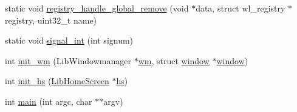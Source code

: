 \begin{DoxyCompactItemize}
\item 
static void \hyperlink{simple-egl_8cpp_a59a731b9efa9d6a2015cdc8ccae1db80}{registry\+\_\+handle\+\_\+global\+\_\+remove} (void $\ast$data, struct wl\+\_\+registry $\ast$registry, uint32\+\_\+t name)
\item 
static void \hyperlink{simple-egl_8cpp_a2cfc8c2d3fc1273ba8f811d2e639aec8}{signal\+\_\+int} (int signum)
\item 
int \hyperlink{simple-egl_8cpp_a644e25276ecdea04f2aa3412c1973927}{init\+\_\+wm} (Lib\+Windowmanager $\ast$\hyperlink{simple-egl_8cpp_ad1513698e07197206c290f94d7669d85}{wm}, struct \hyperlink{structwindow}{window} $\ast$\hyperlink{structwindow}{window})
\item 
int \hyperlink{simple-egl_8cpp_a79aafeb99915566dd3970246f465f306}{init\+\_\+hs} (\hyperlink{class_lib_home_screen}{Lib\+Home\+Screen} $\ast$\hyperlink{simple-egl_8cpp_a529acbd1fed9d98a587edfa62309fa8d}{hs})
\item 
int \hyperlink{simple-egl_8cpp_a3c04138a5bfe5d72780bb7e82a18e627}{main} (int argc, char $\ast$$\ast$argv)
\end{DoxyCompactItemize}
